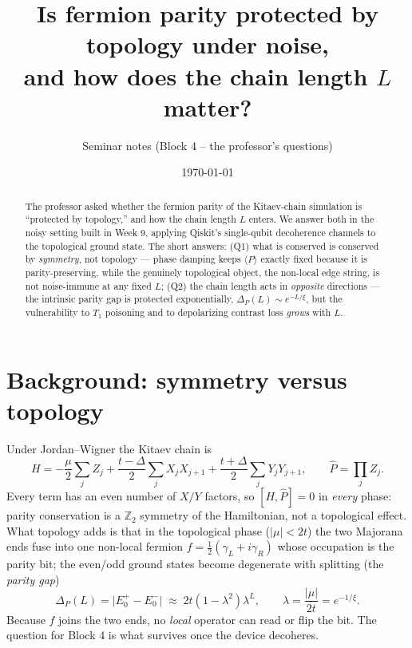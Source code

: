 \documentclass[11pt]{article}
\title{Is fermion parity protected by topology under noise,\\
and how does the chain length $L$ matter?}
\author{Seminar notes (Block 4 -- the professor's questions)}
\date{\today}
\newcommand{\Pop}{\hat{P}}
\newcommand{\expv}[1]{\langle #1\rangle}
\begin{document}
\maketitle

\begin{abstract}
The professor asked whether the fermion parity of the Kitaev-chain simulation is
``protected by topology,'' and how the chain length $L$ enters. We answer both in
the noisy setting built in Week 9, applying Qiskit's single-qubit decoherence
channels to the topological ground state. The short answers: (Q1) what is
conserved is conserved by \emph{symmetry}, not topology --- phase damping keeps
$\expv{\Pop}$ exactly fixed because it is parity-preserving, while the genuinely
topological object, the non-local edge string, is not noise-immune at any fixed
$L$; (Q2) the chain length acts in \emph{opposite} directions --- the intrinsic
parity gap is protected exponentially, $\Delta_P(L)\sim e^{-L/\xi}$, but the
vulnerability to $T_1$ poisoning and to depolarizing contrast loss \emph{grows}
with $L$.
\end{abstract}

\section{Background: symmetry versus topology}

Under Jordan--Wigner the Kitaev chain is
\begin{equation}
  H = -\frac{\mu}{2}\sum_{j} Z_j
      + \frac{t-\Delta}{2}\sum_j X_j X_{j+1}
      + \frac{t+\Delta}{2}\sum_j Y_j Y_{j+1},
  \qquad
  \Pop = \prod_{j} Z_j .
\end{equation}
Every term has an even number of $X/Y$ factors, so $[H,\Pop]=0$ in \emph{every}
phase: parity conservation is a $\mathbb{Z}_2$ symmetry of the Hamiltonian, not a
topological effect. What topology adds is that in the topological phase
($|\mu|<2t$) the two Majorana ends fuse into one non-local fermion
$f=\tfrac12(\gamma_L+i\gamma_R)$ whose occupation is the parity bit; the even/odd
ground states become degenerate with splitting (the \emph{parity gap})
\begin{equation}
  \Delta_P(L)=\bigl|E_0^{+}-E_0^{-}\bigr|
  \;\approx\; 2t(1-\lambda^2)\lambda^{L},
  \qquad
  \lambda=\frac{|\mu|}{2t}=e^{-1/\xi}.
\end{equation}
Because $f$ joins the two ends, no \emph{local} operator can read or flip the
bit. The question for Block 4 is what survives once the device decoheres.
\end{document}
